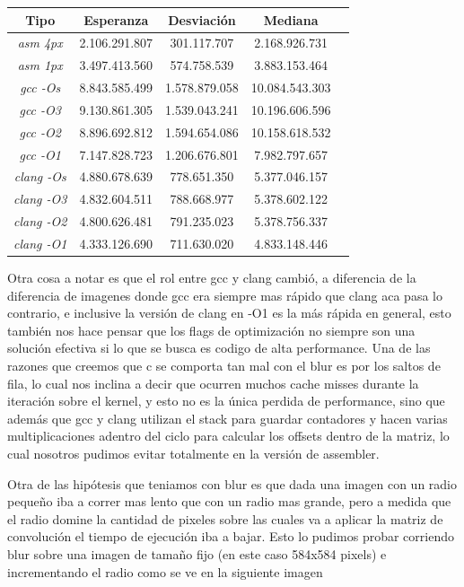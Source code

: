 \documentclass[a4paper]{article}
\begin{document}
\begin{center}

        \begin{tabular}[c]{|c|c|c|c|c|}
    \hline
        \textbf{Tipo}  & \textbf{Esperanza} & \textbf{Desviación} & \textbf{Mediana}\\
        \hline
\textit{asm 4px} &	2.106.291.807 & 301.117.707 & 2.168.926.731 \\
		\hline
\textit{asm 1px} &	3.497.413.560 & 574.758.539 & 3.883.153.464 \\
		\hline
\textit{gcc -Os} &	8.843.585.499 & 1.578.879.058 & 10.084.543.303  \\
		\hline
\textit{gcc -O3} &	9.130.861.305 & 1.539.043.241 & 10.196.606.596  \\
		\hline
\textit{gcc -O2} &	8.896.692.812 & 1.594.654.086 & 10.158.618.532  \\
		\hline
\textit{gcc -O1} &	7.147.828.723 & 1.206.676.801 & 7.982.797.657  \\
		\hline
\textit{clang -Os} & 4.880.678.639 & 778.651.350 & 5.377.046.157  \\
		\hline
\textit{clang -O3} &	4.832.604.511 & 788.668.977 & 5.378.602.122  \\
		\hline
\textit{clang -O2} &	4.800.626.481 & 791.235.023 & 5.378.756.337  \\
		\hline
\textit{clang -O1} &	4.333.126.690 & 711.630.020 & 4.833.148.446  \\
		\hline
	\end{tabular}
\end{center}

 Otra cosa a notar es que el rol entre gcc y clang cambió, a diferencia de la diferencia de imagenes donde gcc era siempre mas rápido que clang aca pasa lo contrario, e inclusive la versión de clang en -O1 es la más rápida en general, esto también nos hace pensar que los flags de optimización no siempre son una solución efectiva si lo que se busca es codigo de alta performance. Una de las razones que creemos que c se comporta tan mal con el blur es por los saltos de fila, lo cual nos inclina a decir que ocurren muchos cache misses durante la iteración sobre el kernel, y esto no es la única perdida de performance, sino que además que gcc y clang utilizan el stack para guardar contadores y hacen varias multiplicaciones adentro del ciclo para calcular los offsets dentro de la matriz, lo cual nosotros pudimos evitar totalmente en la versión de assembler. 


 Otra de las hipótesis que teniamos con blur es que dada una imagen con un radio pequeño iba a correr mas lento que con un radio mas grande, pero a medida que el radio domine la cantidad de pixeles sobre las cuales va a aplicar la matriz de convolución el tiempo de ejecución iba a bajar. Esto lo pudimos probar corriendo blur sobre una imagen de tamaño fijo (en este caso 584x584 pixels) e incrementando el radio como se ve en la siguiente imagen
\end{document}
